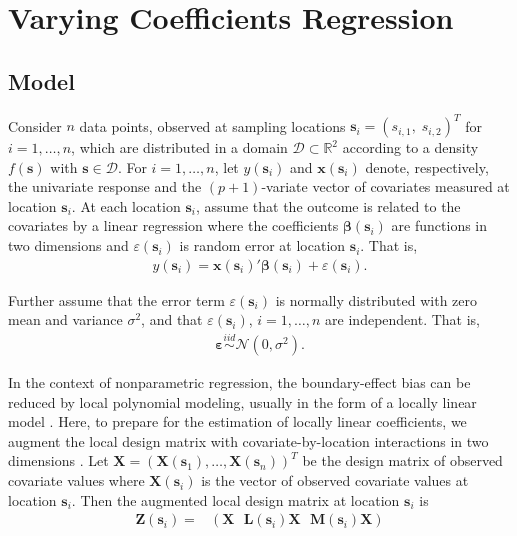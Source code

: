 \documentclass[12pt,english,authoryear, review]{article}\usepackage[]{graphicx}\usepackage[]{color}
\theoremstyle{plain}
\theoremstyle{plain}
\begin{document}
\section{Varying Coefficients Regression\label{sec:vcr}}


\subsection{Model}

Consider $n$ data points, observed at sampling locations $\bm{s}_{i}=(s_{i,1},\; s_{i,2})^{T}$
for $i=1,\dots,n$, which are distributed in a domain $\mathcal{D}\subset\mathbb{R}^{2}$
according to a density $f(\bm{s})$ with $\bm{s}\in\mathcal{D}$.
For $i=1,\dots,n$, let $y(\bm{s}_{i})$ and $\bm{x}(\bm{s}_{i})$
denote, respectively, the univariate response and the $(p+1)$-variate
vector of covariates measured at location $\bm{s}_{i}$. At each location
$\bm{s}_{i}$, assume that the outcome is related to the covariates
by a linear regression where the coefficients $\bm{\beta}(\bm{s}_{i})$
are functions in two dimensions and $\varepsilon(\bm{s}_{i})$ is
random error at location $\bm{s}_{i}$. That is, 
\begin{align}
y(\bm{s}_{i})=\bm{x}(\bm{s}_{i})'\bm{\beta}(\bm{s}_{i})+\varepsilon(\bm{s}_{i}).\label{eq:lm(s)}
\end{align}


Further assume that the error term $\varepsilon(\bm{s}_{i})$ is normally
distributed with zero mean and variance $\sigma^{2}$, and that $\varepsilon(\bm{s}_{i})$,
$i=1,\dots,n$ are independent. That is, 
\begin{align}
\bm{\varepsilon}\overset{iid}{\sim}\mathcal{N}\left(0,\sigma^{2}\right).\label{eq:err}
\end{align}


In the context of nonparametric regression, the boundary-effect bias
can be reduced by local polynomial modeling, usually in the form of
a locally linear model \citep{Fan-Gijbels-1996}. Here, to prepare
for the estimation of locally linear coefficients, we augment the
local design matrix with covariate-by-location interactions in two
dimensions \citep{Wang-2008b}. Let $\bm{X}=\left(\bm{X}\left(\bm{s}_{1}\right),\dots,\bm{X}\left(\bm{s}_{n}\right)\right)^{T}$
be the design matrix of observed covariate values where $\bm{X}\left(\bm{s}_{i}\right)$
is the vector of observed covariate values at location $\bm{s}_{i}$.
Then the augmented local design matrix at location $\bm{s}_{i}$ is
\begin{align}
\bm{Z}(\bm{s}_{i})= & \left(\bm{X}\ \:\:\bm{L}\left(\bm{s}_{i}\right)\bm{X}\ \:\:\bm{M}\left(\bm{s}_{i}\right)\bm{X}\right)\label{eq:augmented-covariates}
\end{align}
\end{document}
